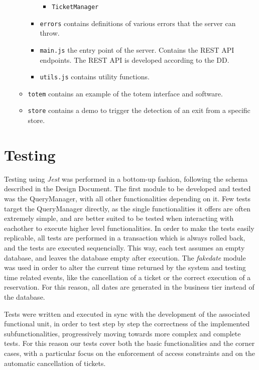 \documentclass[
]{article}
\begin{document}
\begin{itemize}
\begin{itemize}
\begin{itemize}
\begin{itemize}
        \item \texttt{TicketManager}
      \end{itemize}
      \item \texttt{errors} contains definitions of various errors that the server can throw.
      \item \texttt{main.js} the entry point of the server. Contains the REST API endpoints. The REST API is developed according to the DD.
      \item \texttt{utils.js} contains utility functions.
    \end{itemize}
    \item \texttt{totem} contains an example of the totem interface and software.
    \item \texttt{store} contains a demo to trigger the detection of an exit from a specific store.
  \end{itemize}
\end{itemize}

\hypertarget{testing}{%
\section{Testing}\label{testing}}

Testing using \emph{Jest} was performed in a bottom-up fashion, following the schema described in the Design Document. The first module to be developed and tested was the QueryManager, with all other functionalities depending on it. Few tests target the QueryManager directly, as the single functionalities it offers are often extremely simple, and are better suited to be tested when interacting with eachother to execute higher level functionalities. In order to make the tests easily replicable, all tests are performed in a transaction which is always rolled back, and the tests are executed sequencially. This way, each test assumes an empty database, and leaves the database empty after execution. The \emph{fakedate} module was used in order to alter the current time returned by the system and testing time related events, like the cancellation of a ticket or the correct execution of a reservation. For this reason, all dates are generated in the business tier instead of the database.

Tests were written and executed in sync with the development of the associated functional unit, in order to test step by step the correctness of the implemented subfunctionalities, progressively moving towards more complex and complete tests. For this reason our tests cover both the basic functionalities and the corner cases, with a particular focus on the enforcement of access constraints and on the automatic cancellation of tickets.
\end{document}
